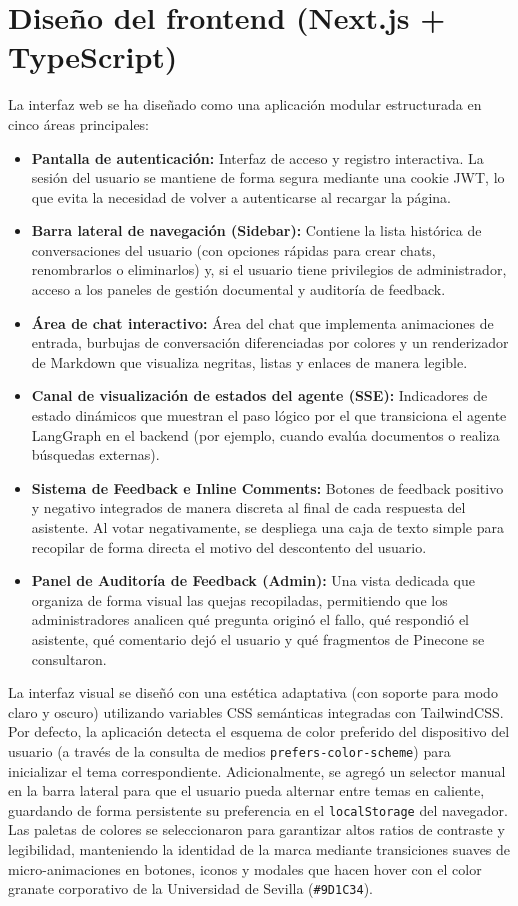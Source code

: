 \documentclass[12pt,a4paper,oneside]{report}
\begin{document}
\section{Diseño del frontend (Next.js + TypeScript)}

La interfaz web se ha diseñado como una aplicación modular estructurada en cinco áreas principales:

\begin{itemize}
    \item \textbf{Pantalla de autenticación:} Interfaz de acceso y registro interactiva. La sesión del usuario se mantiene de forma segura mediante una cookie JWT, lo que evita la necesidad de volver a autenticarse al recargar la página.
    \item \textbf{Barra lateral de navegación (Sidebar):} Contiene la lista histórica de conversaciones del usuario (con opciones rápidas para crear chats, renombrarlos o eliminarlos) y, si el usuario tiene privilegios de administrador, acceso a los paneles de gestión documental y auditoría de feedback.
    \item \textbf{Área de chat interactivo:} Área del chat que implementa animaciones de entrada, burbujas de conversación diferenciadas por colores y un renderizador de Markdown que visualiza negritas, listas y enlaces de manera legible.
    \item \textbf{Canal de visualización de estados del agente (SSE):} Indicadores de estado dinámicos que muestran el paso lógico por el que transiciona el agente LangGraph en el backend (por ejemplo, cuando evalúa documentos o realiza búsquedas externas).
    \item \textbf{Sistema de Feedback e Inline Comments:} Botones de feedback positivo y negativo integrados de manera discreta al final de cada respuesta del asistente. Al votar negativamente, se despliega una caja de texto simple para recopilar de forma directa el motivo del descontento del usuario.
    \item \textbf{Panel de Auditoría de Feedback (Admin):} Una vista dedicada que organiza de forma visual las quejas recopiladas, permitiendo que los administradores analicen qué pregunta originó el fallo, qué respondió el asistente, qué comentario dejó el usuario y qué fragmentos de Pinecone se consultaron.
\end{itemize}

La interfaz visual se diseñó con una estética adaptativa (con soporte para modo claro y oscuro) utilizando variables CSS semánticas integradas con TailwindCSS. Por defecto, la aplicación detecta el esquema de color preferido del dispositivo del usuario (a través de la consulta de medios \texttt{prefers-color-scheme}) para inicializar el tema correspondiente. Adicionalmente, se agregó un selector manual en la barra lateral para que el usuario pueda alternar entre temas en caliente, guardando de forma persistente su preferencia en el \texttt{localStorage} del navegador. Las paletas de colores se seleccionaron para garantizar altos ratios de contraste y legibilidad, manteniendo la identidad de la marca mediante transiciones suaves de micro-animaciones en botones, iconos y modales que hacen hover con el color granate corporativo de la Universidad de Sevilla (\texttt{\#9D1C34}).
\end{document}
